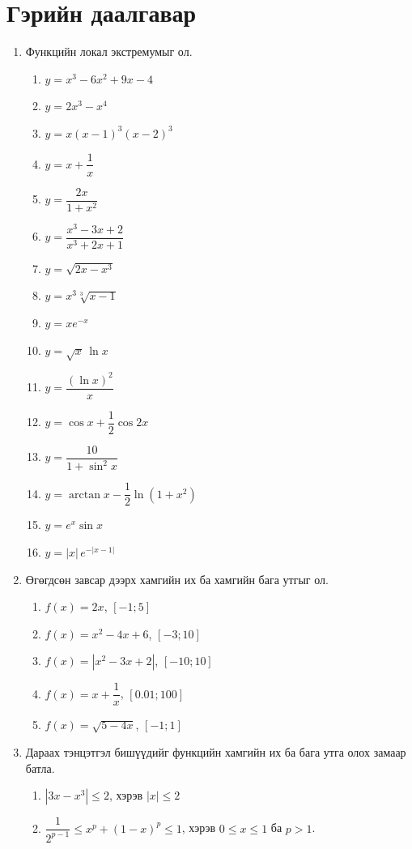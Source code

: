 \section*{Гэрийн даалгавар}
\begin{enumerate}
  \item Функцийн локал экстремумыг ол.
  \begin{enumerate}
  \item  $y = x^3 - 6x^2 + 9x - 4$ 
  \item $y = 2x^3 - x^4$ 
  \item $y = x(x-1)^3(x-2)^3$ 
  \item $y = x + \dfrac{1}{x}$ 
  \item $y = \dfrac{2x}{1+x^2}$ 
  \item $y = \dfrac{x^3 - 3x + 2}{x^3 + 2x + 1}$ 
  \item $y = \sqrt{2x - x^3}$ 
  \item $y = x^3\sqrt[3]{x - 1}$ 
  \item $y = x e^{-x}$
  \item $y = \sqrt{x}\,\ln x$ 
  \item $y = \dfrac{(\ln x)^2}{x}$
  \item $y = \cos x + \dfrac{1}{2}\cos 2x$ 
  \item $y = \dfrac{10}{1 + \sin^2 x}$ 
  \item $y = \arctan x - \dfrac{1}{2}\ln(1 + x^2)$ 
  \item $y = e^x \sin x$ 
  \item $y = |x|\, e^{-|x-1|}$
  \end{enumerate}
\item Өгөгдсөн завсар дээрх хамгийн их ба хамгийн бага утгыг ол.
  \begin{enumerate}
  \item  $f(x) = 2x$, $[-1; 5]$ 
  \item $f(x) = x^2 - 4x + 6$, $[-3; 10]$ 
  \item $f(x) = |x^2 - 3x + 2|$, $[-10; 10]$ 
  \item $f(x) = x + \dfrac{1}{x}$, $[0.01; 100]$ 
  \item $f(x) = \sqrt{5 - 4x}$, $[-1; 1]$ 
  \end{enumerate}
\item Дараах тэнцэтгэл бишүүдийг функцийн хамгийн их ба бага утга олох замаар батла.
   \begin{enumerate}
   \item $|3x - x^3| \le 2$, хэрэв $|x| \le 2$
   \item $\dfrac{1}{2^{p-1}} \le x^p + (1-x)^p \le 1$, хэрэв $0 \le x \le 1$ ба $p>1$.

\end{enumerate}
\end{enumerate}
